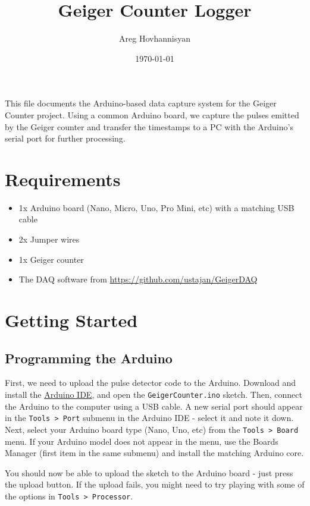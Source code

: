 \documentclass[11pt]{article}
\date{\today}
\title{Geiger Counter Logger}
\author{Areg Hovhannisyan}
\begin{document}
\maketitle
\tableofcontents

\clearpage

This file documents the Arduino-based data capture system for the Geiger Counter project. Using a common Arduino board, we capture the pulses emitted by the Geiger counter and transfer the timestamps to a PC with the Arduino's serial port for further processing. 

\section{Requirements}
\label{sec:org92d3866}
\begin{itemize}
\item 1x Arduino board (Nano, Micro, Uno, Pro Mini, etc) with a matching USB cable
\item 2x Jumper wires
\item 1x Geiger counter
\item The DAQ software from \url{https://github.com/ustajan/GeigerDAQ}
\end{itemize}

\section{Getting Started}
\label{sec:orgcae04a9}
\subsection{Programming the Arduino}
\label{sec:org259ca5b}
First, we need to upload the pulse detector code to the Arduino. Download and install the \href{https://docs.arduino.cc/software/ide-v1}{Arduino IDE}, and open the \texttt{GeigerCounter.ino} sketch. Then, connect the Arduino to the computer using a USB cable. A new serial port should appear in the \texttt{Tools > Port} submenu in the Arduino IDE - select it and note it down. Next, select your Arduino board type (Nano, Uno, etc) from the \texttt{Tools > Board} menu. If your Arduino model does not appear in the menu, use the Boards Manager (first item in the same submenu) and install the matching Arduino core.

You should now be able to upload the sketch to the Arduino board - just press the upload button. If the upload fails, you might need to try playing with some of the options in \texttt{Tools > Processor}.
\end{document}
